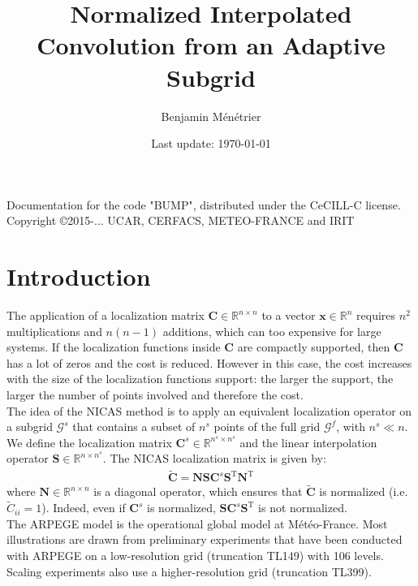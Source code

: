 \documentclass[12pt]{scrartcl}
\begin{document}
\title{\vspace{-1.2cm}Normalized Interpolated Convolution from an Adaptive Subgrid}
\author{Benjamin Ménétrier}
\date{Last update: \today\vspace{-0.5cm}}

\thispagestyle{empty}

\maketitle

\begin{center}
Documentation for the code "BUMP", distributed under the CeCILL-C license.\\
Copyright \copyright 2015-... UCAR, CERFACS, METEO-FRANCE and IRIT
\end{center}

\tableofcontents

\clearpage

\section{Introduction}
The application of a localization matrix $\mathbf{C} \in \mathbb{R}^{n \times n}$ to a vector $\mathbf{x} \in \mathbb{R}^n$ requires $n^2$ multiplications and $n(n-1)$ additions, which can too expensive for large systems. If the localization functions inside $\mathbf{C}$ are compactly supported, then $\mathbf{C}$ has a lot of zeros and the cost is reduced. However in this case, the cost increases with the size of the localization functions support: the larger the support, the larger the number of points involved and therefore the cost.\\
$  $\\
The idea of the NICAS method is to apply an equivalent localization operator on a subgrid $\mathcal{G}^s$ that contains a subset of $n^s$ points of the full grid $\mathcal{G}^f$, with $n^s \ll n$. We define the localization matrix $\mathbf{C}^s \in \mathbb{R}^{n^s \times n^s}$ and the linear interpolation operator $\mathbf{S} \in \mathbb{R}^{n \times n^s}$. The NICAS localization matrix is given by:
\begin{align}
\label{eq:nicas}
\widetilde{\mathbf{C}} = \mathbf{N} \mathbf{S} \mathbf{C}^s \mathbf{S}^\mathrm{T} \mathbf{N}^\mathrm{T}
\end{align}
where $\mathbf{N} \in \mathbb{R}^{n \times n}$ is a diagonal operator, which ensures that $\widetilde{\mathbf{C}}$ is normalized (i.e. $\widetilde{C}_{ii} = 1$). Indeed, even if $\mathbf{C}^s$ is normalized, $\mathbf{S} \mathbf{C}^s \mathbf{S}^\mathrm{T}$ is not normalized.\\
$  $\\
The ARPEGE model is the operational global model at Météo-France. Most illustrations are drawn from preliminary experiments that have been conducted with ARPEGE on a low-resolution grid (truncation TL149) with 106 levels. Scaling experiments also use a higher-resolution grid (truncation TL399).
\end{document}
